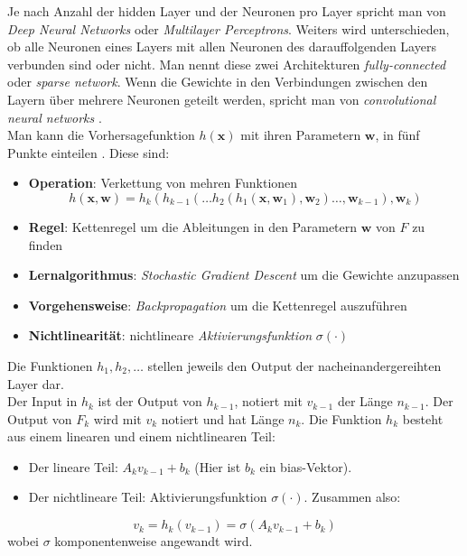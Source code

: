 Je nach Anzahl der hidden Layer und der Neuronen pro Layer spricht man von \textit{Deep Neural Networks} oder \textit{Multilayer Perceptrons}. Weiters wird unterschieden, ob
alle Neuronen eines Layers mit allen Neuronen des darauffolgenden Layers verbunden sind oder nicht. Man nennt diese zwei Architekturen \textit{fully-connected} oder \textit{sparse network}. 
Wenn die Gewichte in den Verbindungen zwischen den Layern \"uber mehrere Neuronen geteilt werden, spricht man von \textit{convolutional neural networks} \cite{strang}. \\

Man kann die Vorhersagefunktion $h(\mathbf{x})$ mit ihren Parametern $\mathbf{w}$, in f\"unf Punkte einteilen \cite{strang}. 
Diese sind:
\begin{itemize}
  \item \textbf{Operation}: Verkettung von mehren Funktionen
   $$h(\mathbf{x}, \mathbf{w}) = h_k(h_{k-1}(\dots h_2(h_1(\mathbf{x}, \mathbf{w}_1), \mathbf{w}_2)\dots,\mathbf{w}_{k-1}),\mathbf{w}_k)$$
  \item \textbf{Regel}: Kettenregel um die Ableitungen in den Parametern $\mathbf{w}$ von $F$ zu finden
  \item \textbf{Lernalgorithmus}: \textit{Stochastic Gradient Descent} um die Gewichte anzupassen
  \item \textbf{Vorgehensweise}: \textit{Backpropagation} um die Kettenregel auszuf\"uhren
  \item \textbf{Nichtlinearit\"at}: nichtlineare \textit{Aktivierungsfunktion} $\sigma(\cdot)$
\end{itemize}

Die Funktionen $h_1, h_2, \dots$ stellen jeweils den Output der nacheinandergereihten Layer dar. \\

Der Input in $h_k$ ist der Output von $h_{k-1}$, notiert mit $v_{k-1}$ der L\"ange $n_{k-1}$. Der Output von $F_k$ wird mit $v_k$ notiert und hat L\"ange $n_k$. 
Die Funktion $h_k$ besteht aus einem linearen und einem nichtlinearen Teil:

\begin{itemize}
  \item Der lineare Teil: $A_k v_{k-1} + b_k$ (Hier ist $b_k$ ein bias-Vektor).
  \item Der nichtlineare Teil: Aktivierungsfunktion $\sigma(\cdot)$. Zusammen also:
\end{itemize}
$$ v_k = h_k(v_{k-1}) = \sigma(A_k v_{k-1} + b_k) $$
wobei $\sigma$ komponentenweise angewandt wird.\\

